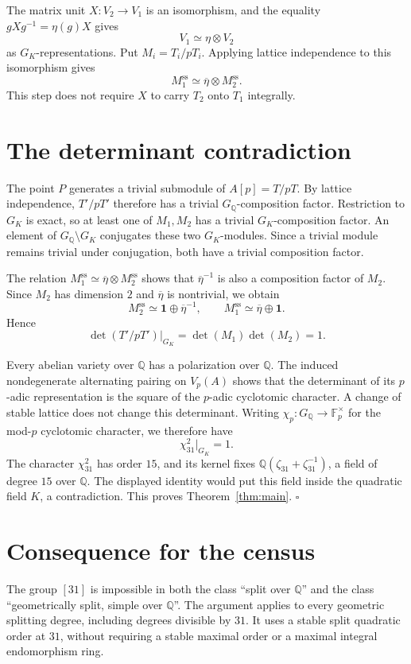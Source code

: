 \documentclass[11pt]{article}
\newcommand{\Q}{\mathbb Q}
\newcommand{\F}{\mathbb F}
\begin{document}
The matrix unit \(X:V_2\to V_1\) is an isomorphism, and the equality
\(gXg^{-1}=\eta(g)X\) gives
\[
 V_1\simeq\eta\otimes V_2
\]
as \(G_K\)-representations. Put \(M_i=T_i/pT_i\). Applying
lattice independence to this isomorphism gives
\[
 M_1^{\mathrm{ss}}\simeq
 \overline\eta\otimes M_2^{\mathrm{ss}}.
\]
This step does not require \(X\) to carry \(T_2\) onto \(T_1\)
integrally.

\section{The determinant contradiction}

The point \(P\) generates a trivial submodule of
\(A[p]=T/pT\). By lattice independence, \(T'/pT'\) therefore has a
trivial \(G_{\Q}\)-composition factor. Restriction to \(G_K\) is
exact, so at least one of \(M_1,M_2\) has a trivial
\(G_K\)-composition factor. An element of \(G_{\Q}\setminus G_K\)
conjugates these two \(G_K\)-modules. Since a trivial module remains
trivial under conjugation, both have a trivial composition factor.

The relation
\(M_1^{\mathrm{ss}}\simeq\overline\eta\otimes M_2^{\mathrm{ss}}\)
shows that \(\overline\eta^{-1}\) is also a composition factor of
\(M_2\). Since \(M_2\) has dimension \(2\) and
\(\overline\eta\) is nontrivial, we obtain
\[
 M_2^{\mathrm{ss}}\simeq\mathbf1\oplus\overline\eta^{-1},
 \qquad
 M_1^{\mathrm{ss}}\simeq\overline\eta\oplus\mathbf1.
\]
Hence
\[
 \det(T'/pT')|_{G_K}=\det(M_1)\det(M_2)=1.
\]

Every abelian variety over \(\Q\) has a polarization over \(\Q\).
The induced nondegenerate alternating pairing on \(V_p(A)\) shows
that the determinant of its \(p\)-adic representation is the square
of the \(p\)-adic cyclotomic character. A change of stable lattice
does not change this determinant. Writing
\(\chi_p:G_{\Q}\to\F_p^\times\) for the mod-\(p\) cyclotomic
character, we therefore have
\[
 \chi_{31}^2|_{G_K}=1.
\]
The character \(\chi_{31}^2\) has order \(15\), and its kernel
fixes \(\Q(\zeta_{31}+\zeta_{31}^{-1})\), a field of degree \(15\)
over \(\Q\). The displayed identity would put this field inside the
quadratic field \(K\), a contradiction. This proves
Theorem~\ref{thm:main}.
\hfill\(\square\)

\section{Consequence for the census}

The group
\href{https://genus-2-torsion.github.io/group.html?g=31}{\([31]\)}
is impossible in both the class ``split over \(\Q\)'' and the class
``geometrically split, simple over \(\Q\)''.
The argument applies to every geometric splitting degree, including
degrees divisible by \(31\). It uses a stable split quadratic order
at \(31\), without requiring a stable maximal order or a maximal
integral endomorphism ring.
\end{document}
